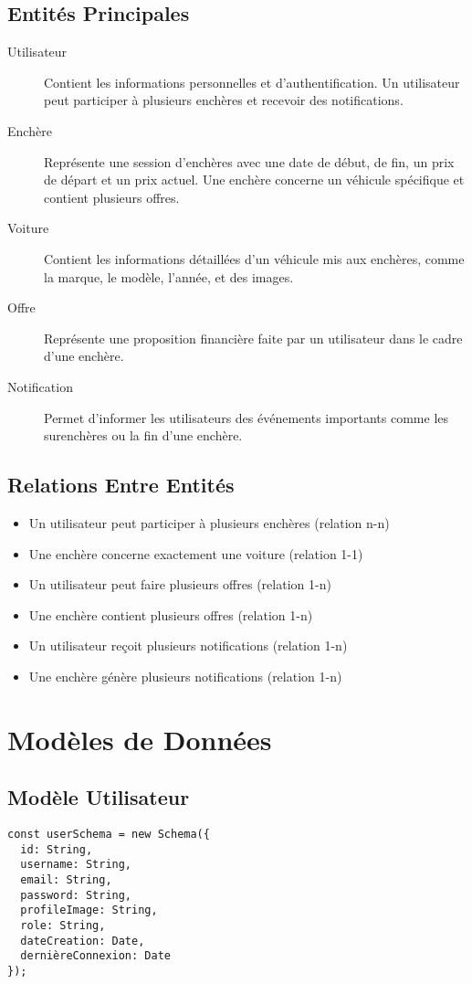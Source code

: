 \subsection{Entités Principales}
\begin{description}
    \item[Utilisateur] Contient les informations personnelles et d'authentification. Un utilisateur peut participer à plusieurs enchères et recevoir des notifications.
    \item[Enchère] Représente une session d'enchères avec une date de début, de fin, un prix de départ et un prix actuel. Une enchère concerne un véhicule spécifique et contient plusieurs offres.
    \item[Voiture] Contient les informations détaillées d'un véhicule mis aux enchères, comme la marque, le modèle, l'année, et des images.
    \item[Offre] Représente une proposition financière faite par un utilisateur dans le cadre d'une enchère.
    \item[Notification] Permet d'informer les utilisateurs des événements importants comme les surenchères ou la fin d'une enchère.
\end{description}

\subsection{Relations Entre Entités}
\begin{itemize}
    \item Un utilisateur peut participer à plusieurs enchères (relation n-n)
    \item Une enchère concerne exactement une voiture (relation 1-1)
    \item Un utilisateur peut faire plusieurs offres (relation 1-n)
    \item Une enchère contient plusieurs offres (relation 1-n)
    \item Un utilisateur reçoit plusieurs notifications (relation 1-n)
    \item Une enchère génère plusieurs notifications (relation 1-n)
\end{itemize}

\section{Modèles de Données}

\subsection{Modèle Utilisateur}
\begin{verbatim}
const userSchema = new Schema({
  id: String,
  username: String,
  email: String,
  password: String,
  profileImage: String,
  role: String,
  dateCreation: Date,
  dernièreConnexion: Date
});
\end{verbatim}

